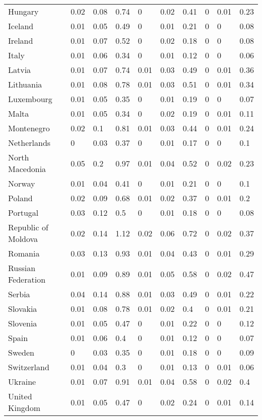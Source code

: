 \begin{longtable}[t]{llllllllll}
Hungary & 0.02 & 0.08 & 0.74 & 0 & 0.02 & 0.41 & 0 & 0.01 & 0.23\\
Iceland & 0.01 & 0.05 & 0.49 & 0 & 0.01 & 0.21 & 0 & 0 & 0.08\\
Ireland & 0.01 & 0.07 & 0.52 & 0 & 0.02 & 0.18 & 0 & 0 & 0.08\\
Italy & 0.01 & 0.06 & 0.34 & 0 & 0.01 & 0.12 & 0 & 0 & 0.06\\
Latvia & 0.01 & 0.07 & 0.74 & 0.01 & 0.03 & 0.49 & 0 & 0.01 & 0.36\\
Lithuania & 0.01 & 0.08 & 0.78 & 0.01 & 0.03 & 0.51 & 0 & 0.01 & 0.34\\
Luxembourg & 0.01 & 0.05 & 0.35 & 0 & 0.01 & 0.19 & 0 & 0 & 0.07\\
Malta & 0.01 & 0.05 & 0.34 & 0 & 0.02 & 0.19 & 0 & 0.01 & 0.11\\
Montenegro & 0.02 & 0.1 & 0.81 & 0.01 & 0.03 & 0.44 & 0 & 0.01 & 0.24\\
Netherlands & 0 & 0.03 & 0.37 & 0 & 0.01 & 0.17 & 0 & 0 & 0.1\\
North Macedonia & 0.05 & 0.2 & 0.97 & 0.01 & 0.04 & 0.52 & 0 & 0.02 & 0.23\\
Norway & 0.01 & 0.04 & 0.41 & 0 & 0.01 & 0.21 & 0 & 0 & 0.1\\
Poland & 0.02 & 0.09 & 0.68 & 0.01 & 0.02 & 0.37 & 0 & 0.01 & 0.2\\
Portugal & 0.03 & 0.12 & 0.5 & 0 & 0.01 & 0.18 & 0 & 0 & 0.08\\
Republic of Moldova & 0.02 & 0.14 & 1.12 & 0.02 & 0.06 & 0.72 & 0 & 0.02 & 0.37\\
Romania & 0.03 & 0.13 & 0.93 & 0.01 & 0.04 & 0.43 & 0 & 0.01 & 0.29\\
Russian Federation & 0.01 & 0.09 & 0.89 & 0.01 & 0.05 & 0.58 & 0 & 0.02 & 0.47\\
Serbia & 0.04 & 0.14 & 0.88 & 0.01 & 0.03 & 0.49 & 0 & 0.01 & 0.22\\
Slovakia & 0.01 & 0.08 & 0.78 & 0.01 & 0.02 & 0.4 & 0 & 0.01 & 0.21\\
Slovenia & 0.01 & 0.05 & 0.47 & 0 & 0.01 & 0.22 & 0 & 0 & 0.12\\
Spain & 0.01 & 0.06 & 0.4 & 0 & 0.01 & 0.12 & 0 & 0 & 0.07\\
Sweden & 0 & 0.03 & 0.35 & 0 & 0.01 & 0.18 & 0 & 0 & 0.09\\
Switzerland & 0.01 & 0.04 & 0.3 & 0 & 0.01 & 0.13 & 0 & 0.01 & 0.06\\
Ukraine & 0.01 & 0.07 & 0.91 & 0.01 & 0.04 & 0.58 & 0 & 0.02 & 0.4\\
United Kingdom & 0.01 & 0.05 & 0.47 & 0 & 0.02 & 0.24 & 0 & 0.01 & 0.14\\

\end{longtable}
